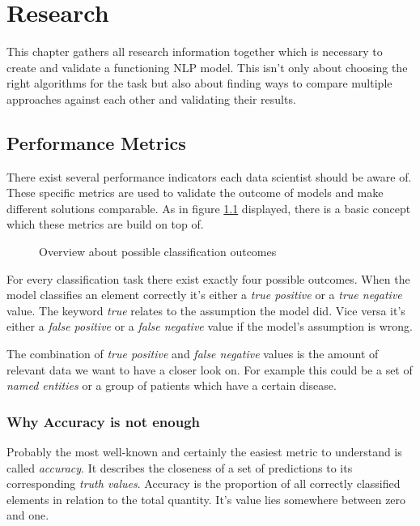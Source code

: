 \chapter{Research}

This chapter gathers all research information together which is necessary to create and validate a functioning NLP model. This
isn't only about choosing the right algorithms for the task but also about finding ways to compare multiple approaches against
each other and validating their results.

\section{Performance Metrics}

There exist several performance indicators each data scientist should be aware of. These specific metrics are used to validate
the outcome of models and make different solutions comparable. As in figure \ref{fig:metrics} displayed, there is a basic
concept which these metrics are build on top of.

\begin{figure}[!ht]
\centering
{}
\caption{Overview about possible classification outcomes}
\label{fig:metrics}
\end{figure}

For every classification task there exist exactly four possible outcomes. When the model classifies an element correctly it's
either a \emph{true positive} or a \emph{true negative} value. The keyword \emph{true} relates to the assumption the model did.
Vice versa it's either a \emph{false positive} or a \emph{false negative} value if the model's assumption is wrong.

The combination of \emph{true positive} and \emph{false negative} values is the amount of relevant data we want to have a closer
look on. For example this could be a set of \emph{named entities} or a group of patients which have a certain disease.

\subsection{Why Accuracy is not enough}

Probably the most well-known and certainly the easiest metric to understand is called \emph{accuracy}. It describes the
closeness of a set of predictions to its corresponding \emph{truth values}. Accuracy is the proportion of all correctly classified
elements in relation to the total quantity. It's value lies somewhere between zero and one.

